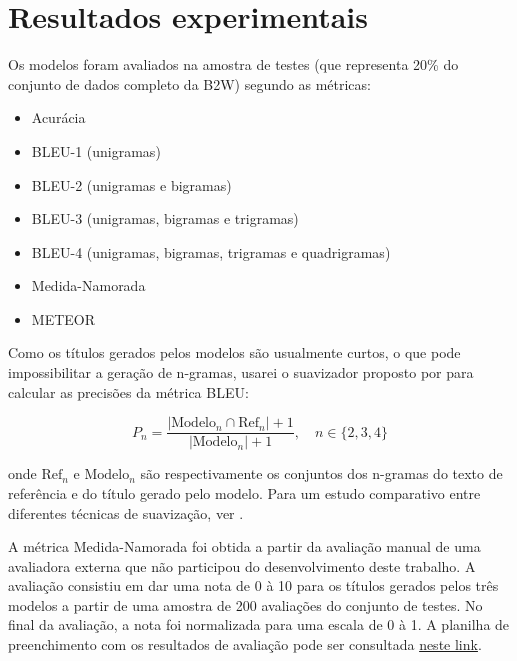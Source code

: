 \documentclass{article}
\begin{document}



\section{Resultados experimentais}

Os modelos foram avaliados na amostra de testes (que representa 20\% do conjunto de dados completo da B2W) segundo as métricas:

\begin{itemize}
	\item Acurácia
	\item BLEU-1 (unigramas)
	\item BLEU-2 (unigramas e bigramas)
	\item BLEU-3 (unigramas, bigramas e trigramas)
	\item BLEU-4 (unigramas, bigramas, trigramas e quadrigramas)
	\item Medida-Namorada
	\item METEOR
\end{itemize}

Como os títulos gerados pelos modelos são usualmente curtos, o que pode impossibilitar a geração de n-gramas, usarei o suavizador proposto por \textcite{lin2004automatic} para calcular as precisões da métrica BLEU:

\begin{equation}
P_n = \frac{|\text{Modelo}_n \cap \text{Ref}_n| + 1}{|\text{Modelo}_n| + 1}, \quad n \in \{2, 3, 4\}
\end{equation}

\noindent onde $\text{Ref}_n$ e $\text{Modelo}_n$ são respectivamente os conjuntos dos n-gramas do texto de referência e do título gerado pelo modelo. Para um estudo comparativo entre diferentes técnicas de suavização, ver \textcite{chen2014systematic}.

A métrica Medida-Namorada foi obtida a partir da avaliação manual de uma avaliadora externa que não participou do desenvolvimento deste trabalho. A avaliação consistiu em dar uma nota de 0 à 10 para os títulos gerados pelos três modelos a partir de uma amostra de 200 avaliações do conjunto de testes. No final da avaliação, a nota foi normalizada para uma escala de 0 à 1. A planilha de preenchimento com os resultados de avaliação pode ser consultada  \href{https://docs.google.com/spreadsheets/d/1v9te15-LVNhdp3a1Iksk0YgP8a0gX4CPlsu6Jc0_5cI/edit?usp=sharing)}{neste link}.
\end{document}
